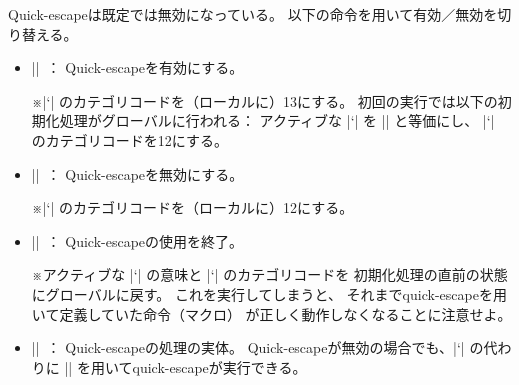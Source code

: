 \documentclass[a4paper]{ltjsarticle}
\newcommand{\Note}{\par\noindent ※}
\newcommand{\Means}{~：\quad}
\begin{document}
Quick-escapeは既定では無効になっている。
以下の命令を用いて有効／無効を切り替える。
\begin{itemize}
\item |\usequickescape|\Means
  Quick-escapeを有効にする。
  \Note |`| のカテゴリコードを（ローカルに）13にする。
  初回の実行では以下の初期化処理がグローバルに行われる：
  アクティブな |`| を |\qesc| と等価にし、
  |`| のカテゴリコードを12にする。
\item |\nousequickescape|\Means
  Quick-escapeを無効にする。
  \Note |`| のカテゴリコードを（ローカルに）12にする。
\item |\finishquickescape|\Means
  Quick-escapeの使用を終了。
  \Note アクティブな |`| の意味と |`| のカテゴリコードを
  初期化処理の直前の状態にグローバルに戻す。
  これを実行してしまうと、
  それまでquick-escapeを用いて定義していた命令（マクロ）
  が正しく動作しなくなることに注意せよ。
\item |\qesc|\Means
  Quick-escapeの処理の実体。
  Quick-escapeが無効の場合でも、|`| の代わりに |\qesc|
  を用いてquick-escapeが実行できる。
\end{itemize}
\end{document}
